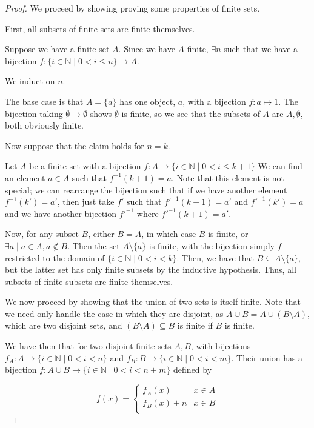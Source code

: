 \documentclass[12pt,letterpaper]{article}
\theoremstyle{definition}
\newcommand{\N}{\mathbb{N}}
\begin{document}
\begin{proof}
    We proceed by showing proving some properties of finite sets.

    First, all subsets of finite sets are finite themselves.
    
    Suppose we have a finite set $A$.
    Since we have $A$ finite, $\exists n$ such that we have a bijection 
    $f: \{i \in \N \mid 0 < i \leq n\} \rightarrow A$.
    
    We induct on $n$.

    The base case is that $A = \{a\}$ has one object, $a$, with a bijection $f: a \mapsto 1$. 
    The bijection taking $\emptyset \rightarrow \emptyset$ shows $\emptyset$ is finite, so
    we see that the subsets of $A$ are $A, \emptyset$, both obviously finite.

    Now suppose that the claim holds for $n = k$.

    Let $A$ be a finite set with a bijection $f: A \rightarrow \{i \in \N \mid 0 < i \leq k+1\}$
    We can find an element $a \in A$ such that $f^{-1}(k+1) = a$.
    Note that this element is not special; we can rearrange the bijection such that
    if we have another element $f^{-1}(k') = a'$, then just take $f'$ such that $f'^{-1}(k+1) = a'$
    and $f'^{-1}(k') = a$ and we have another bijection $f'^{-1}$ where $f'^{-1}(k+1) = a'$.

    Now, for any subset $B$, either $B = A$, in which case $B$ is finite, or $\exists a \mid a \in A, a \notin B$. Then
    the set $A \setminus \{a\}$ is finite, with the bijection simply $f$ restricted to
    the domain of $\{i \in \N \mid 0 < i < k\}$. 
    Then, we have that $B \subseteq A \setminus \{a\}$, but the latter set has only finite
    subsets by the inductive hypothesis.
    Thus, all subsets of finite subsets are finite themselves.

    We now proceed by showing that the union of two sets is itself finite.
    Note that we need only handle the case in which they are disjoint, as $A \cup B = A \cup (B \setminus A)$,
    which are two disjoint sets, and $(B \setminus A) \subseteq B$ is finite if $B$ is finite.

    We have then that for two disjoint finite sets $A, B$, with bijections
    $f_A: A \rightarrow \{i \in \N \mid 0 < i < n\}$ and $f_B: B \rightarrow \{i \in \N \mid 0 < i < m\}$.
    Their union has a bijection $f: A\cup B \rightarrow \{i \in \N \mid 0 < i < n+m\}$
    defined by

    \[
    f(x) = \begin{cases}
        f_A(x) & x \in A \\
        f_B(x) + n & x \in B \\
    \end{cases}
    \]


\end{proof}
\end{document}
